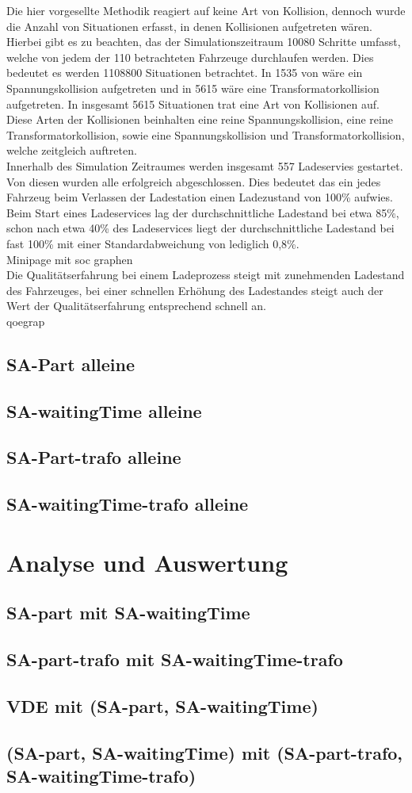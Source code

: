 Die hier vorgesellte Methodik reagiert auf keine Art von Kollision, dennoch wurde die Anzahl von Situationen erfasst, in denen Kollisionen aufgetreten wären. Hierbei gibt es zu beachten, das der Simulationszeitraum 10080 Schritte umfasst, welche von jedem der 110 betrachteten Fahrzeuge durchlaufen werden. Dies bedeutet es werden 1108800 Situationen betrachtet. In 1535 von wäre ein Spannungskollision aufgetreten und in 5615 wäre eine Transformatorkollision aufgetreten. In insgesamt 5615 Situationen trat eine Art von Kollisionen auf. Diese Arten der Kollisionen beinhalten eine reine Spannungskollision, eine reine Transformatorkollision, sowie eine Spannungskollision und Transformatorkollision, welche zeitgleich auftreten.\\
Innerhalb des Simulation Zeitraumes werden insgesamt 557 Ladeservies gestartet. Von diesen wurden alle erfolgreich abgeschlossen. Dies bedeutet das ein jedes Fahrzeug beim Verlassen der Ladestation einen Ladezustand von 100\% aufwies. Beim Start eines Ladeservices lag der durchschnittliche Ladestand bei etwa 85\%, schon nach etwa 40\% des Ladeservices liegt der durchschnittliche Ladestand bei fast 100\% mit einer Standardabweichung von lediglich 0,8\%. \\
Minipage mit soc graphen\\
Die Qualitätserfahrung bei einem Ladeprozess steigt mit zunehmenden Ladestand des Fahrzeuges, bei einer schnellen Erhöhung des Ladestandes steigt auch der Wert der Qualitätserfahrung entsprechend schnell an.\\
qoegrap\\



\subsection{SA-Part alleine}
\subsection{SA-waitingTime alleine}
\subsection{SA-Part-trafo alleine}
\subsection{SA-waitingTime-trafo alleine}
\section{Analyse und Auswertung}
\subsection{SA-part mit SA-waitingTime}
\subsection{SA-part-trafo mit SA-waitingTime-trafo}
\subsection{VDE mit (SA-part, SA-waitingTime)}
\subsection{(SA-part, SA-waitingTime) mit (SA-part-trafo, SA-waitingTime-trafo)}
